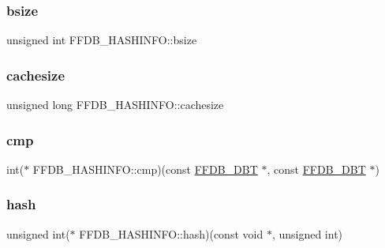 \subsubsection{\texorpdfstring{bsize}{bsize}}
{\footnotesize\ttfamily unsigned int F\+F\+D\+B\+\_\+\+H\+A\+S\+H\+I\+N\+F\+O\+::bsize}

\mbox{\label{structFFDB__HASHINFO_aa04759ec519e79ce156d42660acafb7f}} 
\subsubsection{\texorpdfstring{cachesize}{cachesize}}
{\footnotesize\ttfamily unsigned long F\+F\+D\+B\+\_\+\+H\+A\+S\+H\+I\+N\+F\+O\+::cachesize}

\mbox{\label{structFFDB__HASHINFO_a2c214c2327e467cdb235487f023ddc78}} 
\subsubsection{\texorpdfstring{cmp}{cmp}}
{\footnotesize\ttfamily int($\ast$ F\+F\+D\+B\+\_\+\+H\+A\+S\+H\+I\+N\+F\+O\+::cmp)(const \mbox{\hyperlink{adat-devel_2other__libs_2filedb_2filehash_2ffdb__db_8h_aa2e0984399491df0fdd20898ca8758f9}{F\+F\+D\+B\+\_\+\+D\+BT}} $\ast$, const \mbox{\hyperlink{adat-devel_2other__libs_2filedb_2filehash_2ffdb__db_8h_aa2e0984399491df0fdd20898ca8758f9}{F\+F\+D\+B\+\_\+\+D\+BT}} $\ast$)}

\mbox{\label{structFFDB__HASHINFO_af4b51f3d6131122f6f375d688d6752aa}} 
\subsubsection{\texorpdfstring{hash}{hash}}
{\footnotesize\ttfamily unsigned int($\ast$ F\+F\+D\+B\+\_\+\+H\+A\+S\+H\+I\+N\+F\+O\+::hash)(const void $\ast$, unsigned int)}

\mbox{\label{structFFDB__HASHINFO_aa4a10df8b4ccdd1ac58b4655a943db0d}} 

